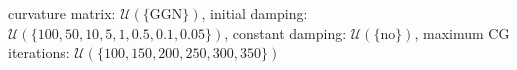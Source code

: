 curvature matrix: $\mathcal{U}(\{\text{GGN}\})$, initial damping: $\mathcal{U}(\{\num[scientific-notation=false]{100},\num[scientific-notation=false]{50},\num[scientific-notation=false]{10},\num[scientific-notation=false]{5},\num[scientific-notation=false]{1},\num[scientific-notation=true]{0.5},\num[scientific-notation=true]{0.1},\num[scientific-notation=true]{0.05}\})$, constant damping: $\mathcal{U}(\{\text{no}\})$, maximum CG iterations: $\mathcal{U}(\{\num[scientific-notation=false]{100},\num[scientific-notation=false]{150},\num[scientific-notation=false]{200},\num[scientific-notation=false]{250},\num[scientific-notation=false]{300},\num[scientific-notation=false]{350}\})$